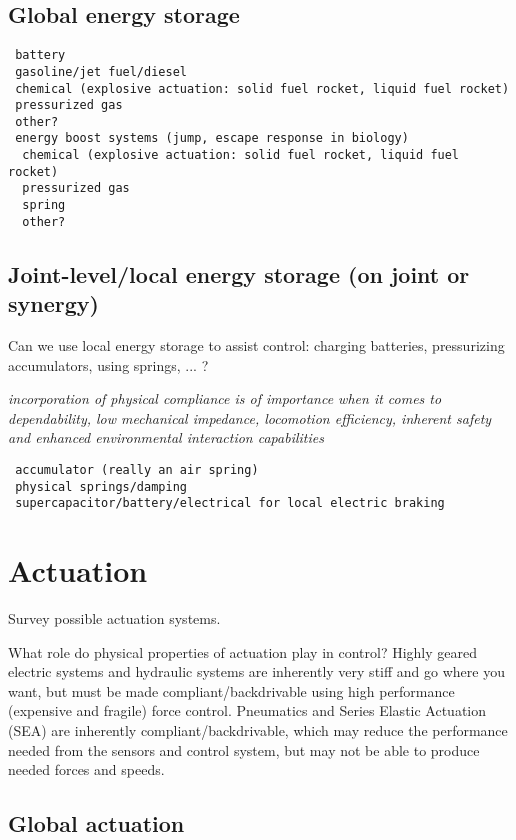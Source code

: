 \documentclass[letterpaper,12pt,fullpage]{article}
\begin{document}
\subsection{Global energy storage}

\begin{verbatim}
 battery
 gasoline/jet fuel/diesel
 chemical (explosive actuation: solid fuel rocket, liquid fuel rocket)
 pressurized gas
 other?
 energy boost systems (jump, escape response in biology)
  chemical (explosive actuation: solid fuel rocket, liquid fuel rocket)
  pressurized gas
  spring
  other?
\end{verbatim}

\subsection{Joint-level/local energy storage (on joint or synergy)}

Can we use local energy storage to assist control: charging batteries,
pressurizing accumulators, using springs, ... ?

{\it incorporation of physical
compliance is of importance when it comes to dependability,
low mechanical impedance, locomotion efficiency, inherent
safety and enhanced environmental interaction capabilities}~\cite{IEEE07139975}

\begin{verbatim}
 accumulator (really an air spring)
 physical springs/damping
 supercapacitor/battery/electrical for local electric braking
\end{verbatim}

\section{Actuation}

Survey possible actuation systems.

What role do physical properties of actuation play in control? Highly
geared electric systems and hydraulic systems are inherently very
stiff and go where you want, but must be made compliant/backdrivable
using high performance (expensive and fragile) force control.
Pneumatics and Series Elastic Actuation (SEA) are inherently
compliant/backdrivable, which may reduce the performance
needed from the sensors and control system, but may not be able to
produce needed forces and speeds.

\subsection{Global actuation}
\end{document}
